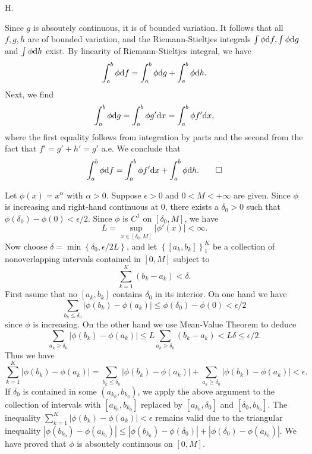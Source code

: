 
\begin{exercise}{7.4}
  H.
\end{exercise}

\begin{exercise}{7.5}
  Since $g$ is absoutely continuous,
  it is of bounded variation.
  It follows that all $f, g, h$ are of bounded variation,
  and the Riemann-Stieltjes integrals
  $\int \phi \mathrm{d} f, \int \phi \mathrm{d} g$ and $\int \phi \mathrm{d} h$ exist.
  By linearity of Riemann-Stieltjes integral, we have
  \[
    \int_a^b \phi \mathrm{d} f = \int_a^b \phi \mathrm{d} g + \int_a^b \phi \mathrm{d} h.
  \]
  Next, we find
  \[
    \int_a^b \phi \mathrm{d} g = \int_a^b \phi g' \mathrm{d} x
    = \int_a^b \phi f' \mathrm{d} x,
  \]
  where the first equality follows from integration by parts
  and the second from the fact that $f' = g' + h' = g'$ a.e.
  We conclude that
  \[
    \int_a^b \phi \mathrm{d} f = \int_a^b \phi f' \mathrm{d} x + \int_a^b \phi \mathrm{d} h.
    \qedhere
  \]
\end{exercise}

\begin{exercise}{7.6}
  Let $\phi(x) = x^{\alpha}$ with $\alpha > 0$.
  Suppose $\epsilon > 0$ and $0 < M < +\infty$ are given.
  Since $\phi$ is increasing and right-hand continuous at $0$,
  there exists a $\delta_0 > 0$ such that
  $\phi(\delta_0) - \phi(0) < \epsilon/2$.
  Since $\phi$ is $C^1$ on $[\delta_0, M]$,
  we have
  \[
    L = \sup_{x \in [\delta_0, M]} \lvert \phi'(x) \rvert < \infty.
  \]
  Now choose $\delta = \min \left\{ \delta_0, {\epsilon}/{2 L} \right\}$,
  and let $\left\{ [a_k, b_k] \right\}_1^K$ be a collection of
  nonoverlapping intervals contained in $[0, M]$ subject to
  \[
    \sum_{k=1}^K \left(b_k - a_k\right) < \delta.
  \]
  First asume that no $[a_k, b_k]$ contains $\delta_0$ in its interior.
  On one hand we have
  \[
    \sum_{b_k \le \delta_0} \lvert \phi(b_k) - \phi(a_k) \rvert
    \le \phi(\delta_0) - \phi(0) < \epsilon/2
  \]
  since $\phi$ is increasing.
  On the other hand we use Mean-Value Theorem to deduce
  \[
    \sum_{a_k \ge \delta_0} \vert \phi(b_k) - \phi(a_k) \vert
    \le L \sum_{a_k \ge \delta_0} \left( b_k - a_k \right)
    < L \delta \le \epsilon/2.
  \]
  Thus we have
  \[
    \sum_{k=1}^K \lvert \phi(b_k) - \phi(a_k) \rvert
    = \sum_{b_k \le \delta_0} \lvert \phi(b_k) - \phi(a_k) \rvert
    + \sum_{a_k \ge \delta_0} \lvert \phi(b_k) - \phi(a_k) \rvert
    < \epsilon.
  \]
  If $\delta_0$ is contained in some $(a_{k_0}, b_{k_0})$,
  we apply the above argument to the collection of intervals
  with $[a_{k_0}, b_{k_0}]$ replaced by
  $[a_{k_0}, \delta_0]$ and $[\delta_0, b_{k_0}]$.
  The inequality
  $\sum_{k=1}^K \lvert \phi(b_k) - \phi(a_k) \rvert < \epsilon$
  remains valid due to the triangular inequality
  $|\phi(b_{k_0}) - \phi(a_{k_0})| \le
  |\phi(b_{k_0}) - \phi(\delta_0)| + |\phi(\delta_0) - \phi(a_{k_0})|$.
  We have proved that $\phi$ is absoutely continuous on $[0, M]$.
\end{exercise}
